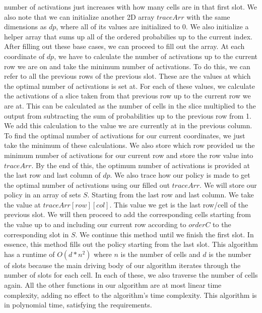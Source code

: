 \documentclass[12pt]{article}
\begin{document}
number of activations just increases with how many cells are in that first slot. We also note that we can
initialize another 2D array $traceArr$ with the same dimensions as $dp$, where all of its values are initialized
to 0. We also initialize a helper array that sums up all of the ordered probabilies up to the current index.
\newline
\newline
After filling out these base cases, we can proceed to fill out the array. At each coordinate of $dp$, we have 
to calculate the number of activations up to the current row we are on and take the minimum number of activations.
To do this, we can refer to all the previous rows of the previous slot. These are the values at which the optimal 
number of activations is set at. For each of these values, we calculate the activations of a slice taken from 
that previous row up to the current row we are at. This can be calculated as the number of cells in the slice 
multiplied to the output from subtracting the sum of probabilities up to the previous row from 1. We add this 
calculation to the value we are currently at in the previous column. To find the optimal number of activations
for our current coordinates, we just take the minimum of these calculations. We also store which row provided us 
the minimum number of activations for our current row and store the row value into $traceArr$. By the end of this,
the optimum number of activations is provided at the last row and last column of $dp$.
\newline
\newline
We also trace how our policy is made to get the optimal number of activations using our filled out $traceArr$. We 
will store our policy in an array of sets $S$. Starting from the last row and last column. We take the value 
at $traceArr[row][col]$. This value we get is the last row/cell of the previous slot. We will then proceed to add 
the corresponding cells starting from the value up to and including our current row according to $orderC$ to 
the corresponding slot in $S$. We continue this method until we finish the first slot. In essence, this method
fills out the policy starting from the last slot.
\newline
\newline
This algorithm has a runtime of $O(d * n^2)$ where $n$ is the number of cells and $d$ is the number of slots because 
the main driving body of our algorithm iterates through the number of slots for each cell. In each of these, we also
traverse the number of cells again. All the other functions in our algorithm are at most linear time complexity, adding
no effect to the algorithm's time complexity. This algorithm is in polynomial time, satisfying the requirements.
\end{document}
